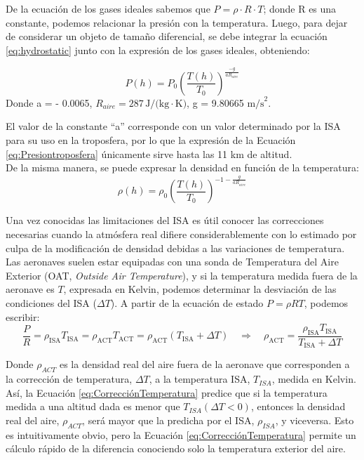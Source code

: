 De la ecuación de los gases ideales sabemos que \(P = \rho \cdot R \cdot T\); donde R es una constante, podemos relacionar la presión con la temperatura. Luego, para dejar de considerar un objeto de tamaño diferencial, se debe integrar la ecuación \ref{eq:hydrostatic} junto con la expresión de los gases ideales, obteniendo:

\begin{definicion} 
	\begin{equation}
		P(h) =P_0 \left(\frac{T(h)}{T_0}\right)^{\frac{-g}{aR_{aire}}}
		 \label{eq:Presiontroposfera}
	\end{equation}
	Donde a = - 0.0065, \( R_{aire} = 287 \, \text{J/(kg} \cdot \text{K)} \), g = 9.80665 \( \text{m/s}^{2} \).
\end{definicion}
El valor de la constante ``a'' corresponde con un valor determinado por la ISA para su uso en la troposfera, por lo que la expresión de la Ecuación \ref{eq:Presiontroposfera} únicamente sirve hasta las 11 km de altitud.\\

De la misma manera, se puede expresar la densidad en función de la temperatura:
\begin{equation}
\rho(h)=\rho_{0}\left(\frac{T(h)}{T_{0}}\right)^{-1-\frac{g}{a R_{aire}}} 
\end{equation}

Una vez conocidas las limitaciones del ISA es útil conocer las correcciones necesarias cuando la atmósfera real difiere considerablemente con lo estimado por culpa de la modificación de densidad debidas a las variaciones de temperatura. Las aeronaves suelen estar equipadas con una sonda de Temperatura del Aire Exterior (OAT, \textit{Outside Air Temperature}), y si la temperatura medida fuera de la aeronave es \( T \), expresada en Kelvin, podemos determinar la desviación de las condiciones del ISA (\( \Delta T \)). A partir de la ecuación de estado \( P = \rho R T \), podemos escribir:
\begin{equation}
\frac{P}{R} = \rho_{\mathrm{ISA}} T_{\mathrm{ISA}} = \rho_{\mathrm{ACT}} T_{\mathrm{ACT}} = \rho_{\mathrm{ACT}} \left(T_{\mathrm{ISA}} + \Delta T\right) \quad \Rightarrow \quad \rho_{\mathrm{ACT}} = \frac{\rho_{\mathrm{ISA}} T_{\mathrm{ISA}}}{T_{\mathrm{ISA}} + \Delta T}
 \label{eq:CorrecciónTemperatura}
\end{equation}


Donde  \(\rho_{A C T} \) es la densidad real del aire fuera de la aeronave que corresponden a la corrección de temperatura, \( \Delta T \), a la temperatura ISA, \(T_{I S A} \), medida en Kelvin. Así, la Ecuación \ref{eq:CorrecciónTemperatura} predice que si la temperatura medida a una altitud dada es menor que \( T_{I S A} (\Delta T < 0) \), entonces la densidad real del aire, \(\rho_{A C T} \), será mayor que la predicha por el ISA, \(\rho_{I S A} \), y viceversa. Esto es intuitivamente obvio, pero la Ecuación  \ref{eq:CorrecciónTemperatura} permite un cálculo rápido de la diferencia conociendo solo la temperatura exterior del aire.\\

